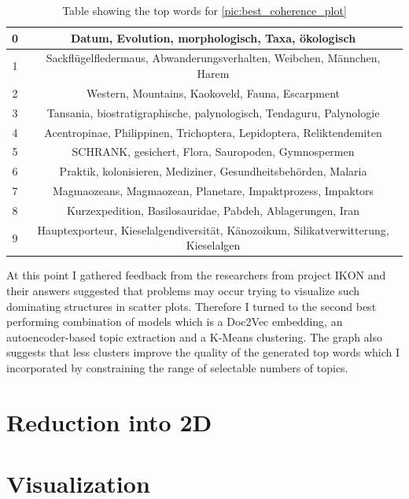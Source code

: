 \begin{table}
	\centering
	\begin{tabular}{c | c}
		0 & Datum, Evolution, morphologisch, Taxa, ökologisch \\ \hline
		1 & Sackflügelfledermaus, Abwanderungsverhalten, Weibchen, Männchen, Harem \\ \hline
		2 & Western, Mountains, Kaokoveld, Fauna, Escarpment \\ \hline
		3 & Tansania, biostratigraphische, palynologisch, Tendaguru, Palynologie \\ \hline
		4 & Acentropinae, Philippinen, Trichoptera, Lepidoptera, Reliktendemiten \\ \hline
		5 & SCHRANK, gesichert, Flora, Sauropoden, Gymnospermen \\ \hline
		6 & Praktik, kolonisieren, Mediziner, Gesundheitsbehörden, Malaria \\ \hline
		7 & Magmaozeans, Magmaozean, Planetare, Impaktprozess, Impaktors \\ \hline
		8 & Kurzexpedition, Basilosauridae, Pabdeh, Ablagerungen, Iran \\ \hline
		9 & Hauptexporteur, Kieselalgendiversität, Känozoikum, Silikatverwitterung, Kieselalgen \\ \hline
	\end{tabular}
	\caption{\label{tab:best_coherence_table} Table showing the top words for {\autoref{pic:best_coherence_plot}}}
\end{table}

At this point I gathered feedback from the researchers from project IKON and their answers suggested that problems may occur trying to visualize such dominating structures in scatter plots. 
Therefore I turned to the second best performing combination of models which is a Doc2Vec embedding, an autoencoder-based topic extraction and a K-Means clustering. The graph also suggests that less clusters improve the quality of the generated top words which I incorporated by constraining the range of selectable numbers of topics.

\section{Reduction into 2D}

\section{Visualization}

